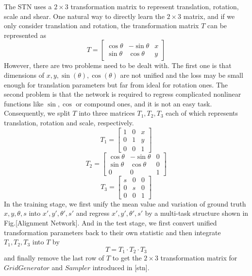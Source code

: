 \documentclass[10pt,conference,a4paper]{IEEEtran}
\begin{document}
	The STN uses a $2 \times 3$ transformation matrix to represent translation, rotation, scale and shear. One natural way to directly learn the $2 \times 3$ matrix, and if we only consider translation and rotation, the transformation matrix $T$ can be represented as 
	\begin{equation}
		T = 
		\begin{bmatrix}
			\cos\theta & -\sin\theta & x\\ 
			\sin\theta & \cos\theta & y
		\end{bmatrix}
	\end{equation}
	However, there are two problems need to be dealt with. The first one is that dimensions of $x, y, \sin(\theta), \cos(\theta)$ are not unified and the loss may be small enough for translation parameters but far from ideal for rotation ones. The second problem is that the network is required to regress complicated nonlinear functions like $\sin, \cos$ or compound ones, and it is not an easy task. Consequently, we split $T$ into three matrices $T_1, T_2, T_3$ each of which represents translation, rotation and scale, respectively.
	\begin{equation}
		T_1 = 
		\begin{bmatrix}
			1 & 0 & x\\
			0 & 1 & y\\
			0 & 0 & 1
		\end{bmatrix}
	\end{equation}
	\begin{equation}
		T_2 = 
		\begin{bmatrix}
			\cos\theta & -\sin\theta & 0\\
			\sin\theta & \cos\theta & 0\\
			0 & 0 & 1
		\end{bmatrix}
	\end{equation}
	\begin{equation}
		T_3 = 
		\begin{bmatrix}
			s & 0 & 0\\
			0 & s & 0\\
			0 & 0 & 1
		\end{bmatrix}
	\end{equation}
	In the training stage, we first unify the mean value and variation of ground truth $x, y, \theta, s$ into $x', y', \theta', s'$ and regress $x', y', \theta', s'$ by a multi-task structure shown in Fig.[Alignment Network]. And in the test stage, we first convert unified transformation parameters back to their own statistic and then integrate $T_1, T_2, T_3$ into $T$ by
	\begin{equation}
		T = T_1 \cdot T_2 \cdot T_3
	\end{equation}
	and finally remove the last row of $T$ to get the $2 \times 3$ transformation matrix for $Grid Generator$ and $Sampler$ introduced in [stn].
	
\end{document}
